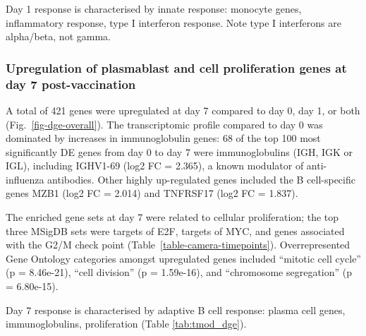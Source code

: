 Day 1 response is characterised by innate response: monocyte genes, inflammatory response, type I interferon response.
Note type I interferons are alpha/beta, not gamma.

\subsubsection{Upregulation of plasmablast and cell proliferation genes at day 7 post-vaccination}

A total of 421 genes were upregulated at day 7 compared to day 0, day 1, or both (Fig.~\ref{fig-dge-overall}).
The transcriptomic profile compared to day 0 was dominated by increases in immunoglobulin genes: 68 of the top 100 most significantly DE genes from day 0 to day 7 were immunoglobulins (IGH, IGK or IGL), including IGHV1-69 (log2 FC = 2.365), a known modulator of anti-influenza antibodies\autocite{Avnir2016}.
Other highly up-regulated genes included the B cell-specific genes MZB1 (log2 FC = 2.014) and TNFRSF17 (log2 FC = 1.837).

The enriched gene sets at day 7 were related to cellular proliferation; the top three MSigDB sets were targets of E2F, targets of MYC, and genes associated with the G2/M check point (Table~\ref{table-camera-timepoints}).
Overrepresented Gene Ontology categories amongst upregulated genes included ``mitotic cell cycle'' (p = 8.46e-21), ``cell division'' (p = 1.59e-16), and ``chromosome segregation'' (p = 6.80e-15).

Day 7 response is characterised by adaptive B cell response: plasma cell genes, immunoglobulins, proliferation (Table \ref{tab:tmod_dge}).

